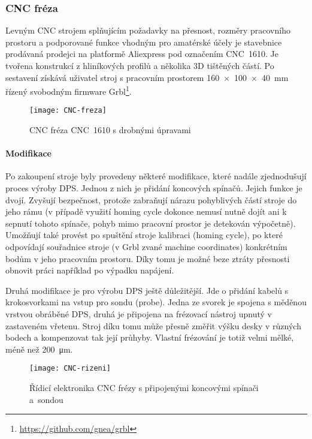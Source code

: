 \subsubsection{CNC fréza}
Levným CNC strojem splňujícím požadavky na přesnost, rozměry pracovního
prostoru a podporované funkce vhodným pro amatérské účely je stavebnice
prodávaná prodejci na platformě Aliexpress pod označením CNC~1610. Je tvořena
konstrukcí z hliníkových profilů a několika 3D tištěných částí. Po sestavení
získává uživatel stroj s pracovním prostorem \SI{160 x 100 x 40}{\milli\meter}
řízený svobodným firmware Grbl\footnote{\url{https://github.com/gnea/grbl}}.

\begin{figure}[htbp]
    \centering
    \texttt{[image: CNC-freza]}
    \caption{CNC fréza CNC~1610 s drobnými úpravami}
    \label{fig:CNC freza}
\end{figure}


\paragraph{Modifikace}
Po zakoupení stroje byly provedeny některé modifikace, které nadále
zjednodušují proces výroby DPS. Jednou z nich je přidání koncových spínačů.
Jejich funkce je dvojí. Zvyšují bezpečnost, protože zabraňují nárazu
pohyblivých částí stroje do jeho rámu (v případě využití
\foreignlanguage{english}{homing cycle} dokonce nemusí nutně dojít ani
k sepnutí tohoto spínače, pohyb mimo pracovní prostor je detekován výpočetně).
Umožňují také provést po spuštění stroje kalibraci
(\foreignlanguage{english}{homing cycle}), po které odpovídají souřadnice
stroje (v Grbl zvané \foreignlanguage{english}{machine coordinates})
konkrétním bodům v jeho pracovním prostoru. Díky tomu je možné beze ztráty
přesnosti obnovit práci například po výpadku napájení.

Druhá modifikace je pro výrobu DPS ještě důležitější. Jde o přidání kabelů
s krokosvorkami na vstup pro sondu (\foreignlanguage{english}{probe}). Jedna ze
svorek je spojena s měděnou vrstvou obráběné DPS, druhá je připojena na
frézovací nástroj upnutý v zastaveném vřetenu. Stroj díku tomu může přesně
změřit výšku desky v různých bodech a kompenzovat tak její průhyby. Vlastní
frézování je totiž velmi mělké, méně než \SI{200}{\micro\meter}.

\begin{figure}[htbp]
    \centering
    \texttt{[image: CNC-rizeni]}
    \caption{%
        Řídicí elektronika CNC frézy s připojenými koncovými spínači a~sondou
    }
    \label{fig:CNC rizeni}
\end{figure}

